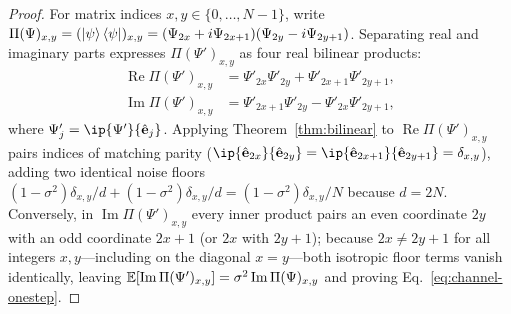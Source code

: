 \begin{proof}
For matrix indices $x, y \in \{0, \dots, N - 1\}$, write $\Pi(\Psi)_{x,y} = (\ket{\psi}\bra{\psi})_{x,y} = (\Psi_{2x} + i\Psi_{2x+1})(\Psi_{2y} - i\Psi_{2y+1})$. Separating real and imaginary parts expresses $\Pi(\Psi')_{x,y}$ as four real bilinear products:
\begin{align}
\operatorname{Re}\Pi(\Psi')_{x,y} &= \Psi'_{2x}\Psi'_{2y} + \Psi'_{2x+1}\Psi'_{2y+1}, \nonumber \\
\operatorname{Im}\Pi(\Psi')_{x,y} &= \Psi'_{2x+1}\Psi'_{2y} - \Psi'_{2x}\Psi'_{2y+1},
\label{eq:re-im-decomp}
\end{align}
where $\Psi'_j = \ip{\Psi'}{\hat{\mathbf{e}}_j}$.
Applying Theorem~\ref{thm:bilinear} to $\operatorname{Re}\Pi(\Psi')_{x,y}$ pairs indices of matching parity ($\ip{\hat{\mathbf{e}}_{2x}}{\hat{\mathbf{e}}_{2y}} = \ip{\hat{\mathbf{e}}_{2x+1}}{\hat{\mathbf{e}}_{2y+1}} = \delta_{x,y}$), adding two identical noise floors $(1 - \sigma^2)\delta_{x,y}/d + (1 - \sigma^2)\delta_{x,y}/d = (1 - \sigma^2)\delta_{x,y}/N$ because $d = 2N$. Conversely, in $\operatorname{Im}\Pi(\Psi')_{x,y}$ every inner product pairs an even coordinate $2y$ with an odd coordinate $2x + 1$ (or $2x$ with $2y + 1$); because $2x \ne 2y + 1$ for all integers $x, y$---including on the diagonal $x = y$---both isotropic floor terms vanish identically, leaving $\mathbb{E}[\operatorname{Im}\Pi(\Psi')_{x,y}] = \sigma^2 \operatorname{Im}\Pi(\Psi)_{x,y}$ and proving Eq.~\eqref{eq:channel-onestep}.


\end{proof}
